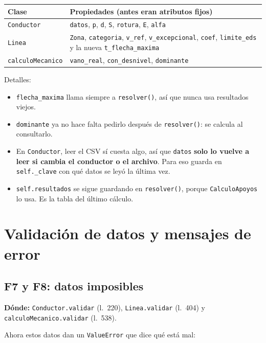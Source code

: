 \documentclass[11pt,a4paper]{article}
\newcommand{\code}[1]{\texttt{#1}}
\begin{document}
\begin{center}
\begin{tabular}{lp{10cm}}
\toprule
\textbf{Clase} & \textbf{Propiedades (antes eran atributos fijos)} \\
\midrule
\code{Conductor}       & \code{datos}, \code{p}, \code{d}, \code{S}, \code{rotura}, \code{E}, \code{alfa} \\
\code{Linea}           & \code{Zona}, \code{categoria}, \code{v\_ref}, \code{v\_excepcional}, \code{coef}, \code{limite\_eds} y la nueva \code{t\_flecha\_maxima} \\
\code{calculoMecanico} & \code{vano\_real}, \code{con\_desnivel}, \code{dominante} \\
\bottomrule
\end{tabular}
\end{center}

Detalles:
\begin{itemize}[leftmargin=1.5em]
  \item \code{flecha\_maxima} llama siempre a \code{resolver()}, así que nunca usa resultados viejos.
  \item \code{dominante} ya no hace falta pedirlo después de \code{resolver()}: se calcula al consultarlo.
  \item En \code{Conductor}, leer el CSV sí cuesta algo, así que \code{datos} \textbf{solo lo vuelve a leer si cambia el conductor o el archivo}. Para eso guarda en \code{self.\_clave} con qué datos se leyó la última vez.
  \item \code{self.resultados} se sigue guardando en \code{resolver()}, porque \code{CalculoApoyos} lo usa. Es la tabla del último cálculo.
\end{itemize}

\section{Validación de datos y mensajes de error}

\subsection{F7 y F8: datos imposibles}

\noindent\textbf{Dónde:} \code{Conductor.validar} (l.~220), \code{Linea.validar} (l.~404) y \code{calculoMecanico.validar} (l.~538).\par\medskip

Ahora estos datos dan un \code{ValueError} que dice qué está mal:
\end{document}
